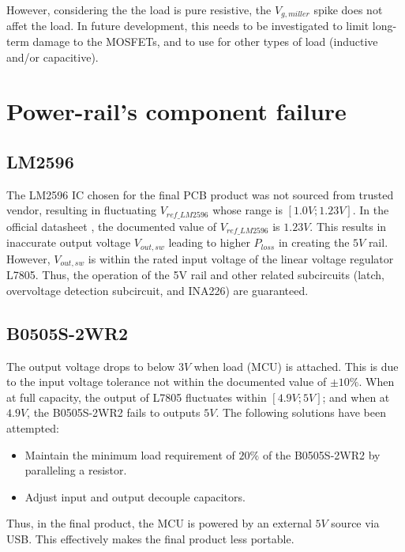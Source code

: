 \documentclass[../main.tex]{subfiles}
\begin{document}
    \justify
    However, considering the the load is pure resistive, the $V_{g, miller}$ spike does not affet the load. In future development, this needs to be investigated to limit long-term damage to the MOSFETs, and to use for other types of load (inductive and/or capacitive).

    \pagebreak
    \section{Power-rail's component failure} \label{sec:result_power_rail}

    \subsection{LM2596}
    \justify
    The LM2596 IC chosen for the final PCB product was not sourced from trusted vendor, resulting in fluctuating $V_{ref\_LM2596}$ whose range is $[1.0V;1.23V]$. In the official datasheet \cite{LM2596}, the documented value of $V_{ref\_LM2596}$  is $1.23V$. This results in inaccurate output voltage $V_{out, sw}$ leading to higher $P_{loss}$ in creating the $5V$ rail. However, $V_{out, sw}$ is within the rated input voltage of the linear voltage regulator L7805. Thus, the operation of the 5V rail and other related subcircuits (latch, overvoltage detection subcircuit, and INA226) are guaranteed.

    \subsection{B0505S-2WR2}
    \justify
    The output voltage drops to below $3V$ when load (MCU) is attached. This is due to the input voltage tolerance not within the documented value of $\pm 10\%$. When at full capacity, the output of L7805 fluctuates within $[4.9V; 5V]$; and when at $4.9V$, the B0505S-2WR2 fails to outputs $5V$. The following solutions have been attempted:

    \begin{itemize}
        \item Maintain the minimum load requirement of $20\%$ of the B0505S-2WR2 by paralleling a resistor.
        \item Adjust input and output decouple capacitors.
    \end{itemize}

    \justify
    Thus, in the final product, the MCU is powered by an external $5V$ source via USB. This effectively makes the final product less portable.
\end{document}
